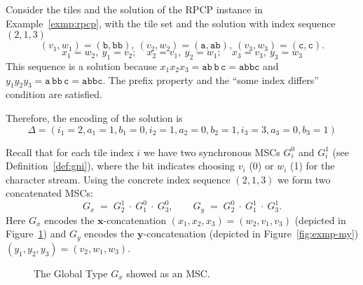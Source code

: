 \begin{example}
Consider the tiles and the solution of the RPCP instance 
in Example~\ref{exmp:rpcp}, with the tile set and the solution
with index sequence $(2,1,3)$
$$
 (v_1,w_1)=(\texttt{b},\texttt{bb}),\ 
 (v_2,w_2)=(\texttt{a},\texttt{ab}),\ 
 (v_3,w_3)=(\texttt{c},\texttt{c}).
$$
$$
 x_1=w_2,\ y_1=v_2;\quad x_2=v_1,\ y_2=w_1;\quad x_3=v_3,\ y_3=w_3
$$
This sequence is a solution because
$x_1x_2x_3=\texttt{ab}\,\texttt{b}\,\texttt{c}=\texttt{abbc}$ and
$y_1y_2y_3=\texttt{a}\,\texttt{bb}\,\texttt{c}=\texttt{abbc}$. The
prefix property and the ``some index differs'' condition are satisfied.

Therefore, the encoding of the solution is
$$\Delta = (i_1=2,a_1=1,b_1=0,i_2=1,a_2=0,b_2=1,i_3=3,a_3=0,b_3=1)$$

Recall that for each tile index \(i\) we have two synchronous MSCs
\(G_i^0\) and \(G_i^1\) (see Definition~\ref{def:gni}), where the bit
indicates choosing \(v_i\) (0) or \(w_i\) (1) for the character stream.
Using the concrete index sequence \((2,1,3)\) we form two
concatenated MSCs:
\[
  G_x\;=\; G^{1}_{2}\ \cdot\ G^{0}_{1}\ \cdot\ G^{0}_{3},
\qquad
  G_y\;=\; G^{0}_{2}\ \cdot\ G^{1}_{1}\ \cdot\ G^{1}_{3}.
\]
Here \(G_x\) encodes the \(\mathbf{x}\)-concatenation
\((x_1,x_2,x_3)=(w_2,v_1,v_3)\) (depicted 
in Figure~\ref{fig:exmp-mx}) and \(G_y\) encodes 
the \(\mathbf{y}\)-concatenation (depicted in 
Figure~\ref{fig:exmp-my}) \((y_1,y_2,y_3)=(v_2,w_1,w_3)\).

\begin{figure}[!ht]
\centering
\begin{msc}[draw frame=none, draw head=none, msc keyword=, head height=0px, label distance=0.5ex, foot height=0px, foot distance=0px]{}
	\declinst{P2}{P2}{}



\end{msc}
\caption{The Global Type $G_x$ showed as an MSC.}
\label{fig:exmp-mx}
\end{figure}


\end{example}
